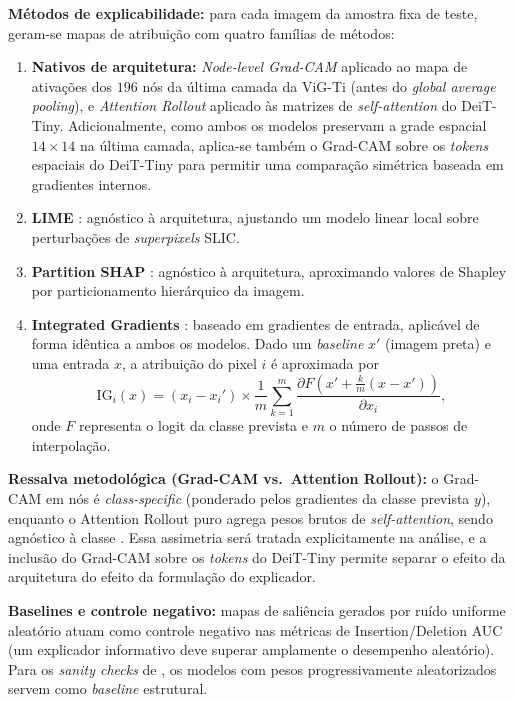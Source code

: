 \documentclass{article}
\begin{document}
\textbf{Métodos de explicabilidade:} para cada imagem da amostra fixa de teste, geram-se mapas de atribuição com quatro famílias de métodos:
\begin{enumerate}
    \item \textbf{Nativos de arquitetura:} \textit{Node-level Grad-CAM} \citep{pope2019gnn,selvaraju2017gradcam} aplicado ao mapa de ativações dos $196$ nós da última camada da ViG-Ti (antes do \textit{global average pooling}), e \textit{Attention Rollout} \citep{abnar2020rollout} aplicado às matrizes de \textit{self-attention} do DeiT-Tiny. Adicionalmente, como ambos os modelos preservam a grade espacial $14 \times 14$ na última camada, aplica-se também o Grad-CAM sobre os \textit{tokens} espaciais do DeiT-Tiny para permitir uma comparação simétrica baseada em gradientes internos.
    \item \textbf{LIME} \citep{ribeiro2016lime}: agnóstico à arquitetura, ajustando um modelo linear local sobre perturbações de \textit{superpixels} SLIC.
    \item \textbf{Partition SHAP} \citep{lundberg2017shap}: agnóstico à arquitetura, aproximando valores de Shapley por particionamento hierárquico da imagem.
    \item \textbf{Integrated Gradients} \citep{sundararajan2017ig}: baseado em gradientes de entrada, aplicável de forma idêntica a ambos os modelos. Dado um \textit{baseline} $x'$ (imagem preta) e uma entrada $x$, a atribuição do pixel $i$ é aproximada por
    \begin{equation}
        \mathrm{IG}_i(x) = (x_i - x_i') \times \frac{1}{m}\sum_{k=1}^{m} \frac{\partial F\left(x' + \frac{k}{m}(x - x')\right)}{\partial x_i},
    \end{equation}
    onde $F$ representa o logit da classe prevista e $m$ o número de passos de interpolação.
\end{enumerate}

\textbf{Ressalva metodológica (Grad-CAM vs.\ Attention Rollout):} o Grad-CAM em nós é \textit{class-specific} (ponderado pelos gradientes da classe prevista $y$), enquanto o Attention Rollout puro agrega pesos brutos de \textit{self-attention}, sendo agnóstico à classe \citep{chefer2021transformer}. Essa assimetria será tratada explicitamente na análise, e a inclusão do Grad-CAM sobre os \textit{tokens} do DeiT-Tiny permite separar o efeito da arquitetura do efeito da formulação do explicador.

\textbf{Baselines e controle negativo:} mapas de saliência gerados por ruído uniforme aleatório atuam como controle negativo nas métricas de Insertion/Deletion AUC (um explicador informativo deve superar amplamente o desempenho aleatório). Para os \textit{sanity checks} de \citet{adebayo2018sanity}, os modelos com pesos progressivamente aleatorizados servem como \textit{baseline} estrutural.
\end{document}
